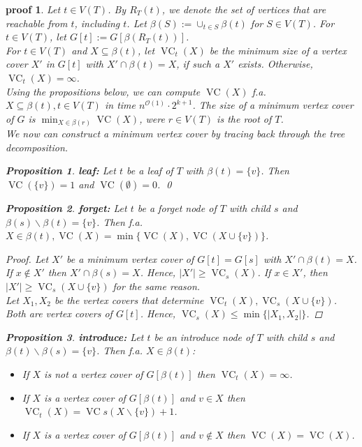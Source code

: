 \documentclass[11pt,a4paper]{article}
\newtheorem*{proposition}{Proposition}
\newtheorem*{proof_}{proof}
\DeclareMathOperator{\VC}{VC}
\begin{document}
\begin{proof_}
Let $t \in V(T)$. By $R_{T}(t)$, we denote the set of vertices that are reachable from $t$, including $t$. Let $\beta(S) := \cup_{t \in S} \beta(t)$ for $S \in V(T)$. For $t \in V(T)$, let $G[t] := G[\beta(R_{T}(t))]$. \\

For $t \in V(T)$ and $X \subseteq \beta(t)$, let $\VC_{t}(X)$ be the minimum size of a vertex cover $X'$ in $G[t]$ with $X' \cap \beta(t) = X$, if such a $X'$ exists. Otherwise, $\VC_{t}(X) = \infty$. \\

Using the propositions below, we can compute $\VC(X)$ f.a. $X \subseteq \beta(t), t \in V(T)$ in time $n^{\mathcal{O}(1)} \cdot 2^{k+1}$. The size of a minimum vertex cover of $G$ is $\min_{X \in \beta(r)} \VC(X)$, were $r \in V(T)$ is the root of $T$. \\
We now can construct a minimum vertex cover by tracing back through the tree decomposition.

\begin{proposition}
\textbf{leaf:} Let $t$ be a leaf of $T$ with $\beta(t) = \{v\}$. Then $\VC(\{v\}) = 1$ and $\VC(\emptyset) = 0$. \qed
\end{proposition}

\begin{proposition}
\textbf{forget:} Let $t$ be a forget node of $T$ with child $s$ and $\beta(s) \backslash \beta(t) = \{v\}$. Then f.a. $X \in \beta(t), \VC(X) = \min \{\VC(X), \VC(X \cup \{v\})\}$.
\end{proposition}

\begin{proof}
Let $X'$ be a minimum vertex cover of $G[t] = G[s]$ with $X' \cap \beta(t) = X$. If $x \not \in X'$ then $X' \cap \beta(s) = X$. Hence, $|X'| \geq \VC_{s}(X)$. If $x \in X'$, then $|X'| \geq \VC_{s}(X \cup \{v\})$ for the same reason. \\
Let $X_{1}, X_{2}$ be the vertex covers that determine $\VC_{t}(X),  \VC_{s}(X \cup \{v\})$. Both are vertex covers of $G[t]$. Hence, $\VC_{s}(X) \leq \min \{|X_{1}, X_{2}| \}$.
\end{proof}


\begin{proposition}
\textbf{introduce:} Let $t$ be an introduce node of $T$ with child $s$ and $\beta(t) \backslash \beta(s) = \{v\}$. Then f.a. $X \in \beta(t)$:

\begin{itemize}
\item [(1)] If $X$ is not a vertex cover of $G[\beta(t)]$ then $\VC_{t}(X) = \infty$. 
\item [(2)] If $X$ is a vertex cover of $G[\beta(t)]$ and $v \in X$ then $\VC_{t}(X) = \VC{s}(X \backslash \{v\}) + 1$.
\item [(3)] If $X$ is a vertex cover of $G[\beta(t)]$ and $v \not \in X$ then $\VC(X) = \VC(X)$.
\end{itemize}
\end{proposition}


\end{proof_}
\end{document}
